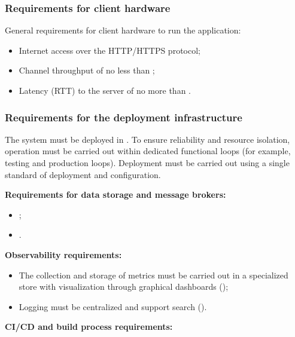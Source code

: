 \documentclass[12pt,a4paper]{extarticle}
\begin{document}
\subsubsection{Requirements for client hardware}

General requirements for client hardware to run the application:

\begin{itemize}[leftmargin=1.25cm]
\item Internet access over the HTTP/HTTPS protocol;
\item Channel throughput of no less than ;
\item Latency (RTT) to the server of no more than .
\end{itemize}

\subsubsection{Requirements for the deployment infrastructure}
\label{sec:deployment_infra}

The system must be deployed in . To ensure reliability and resource isolation, operation must be carried out within dedicated functional loops (for example, testing and production loops). Deployment must be carried out using a single standard of deployment and configuration.

\textbf{Requirements for data storage and message brokers:}

\begin{itemize}[leftmargin=1.25cm]
\item {};
\item {}.
\end{itemize}

\textbf{Observability requirements:}

\begin{itemize}[leftmargin=1.25cm]
\item The collection and storage of metrics must be carried out in a specialized store with visualization through graphical dashboards ();
\item Logging must be centralized and support search ().
\end{itemize}

\textbf{CI/CD and build process requirements:}
\end{document}
